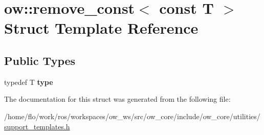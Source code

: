 \hypertarget{structow_1_1remove__const_3_01const_01T_01_4}{}\section{ow\+:\+:remove\+\_\+const$<$ const T $>$ Struct Template Reference}
\label{structow_1_1remove__const_3_01const_01T_01_4}
\subsection*{Public Types}
\begin{DoxyCompactItemize}
\item 
typedef T {\bfseries type}\hypertarget{structow_1_1remove__const_3_01const_01T_01_4_a08b36ca09fc3c79ee3c3c1cbe43d3a8a}{}\label{structow_1_1remove__const_3_01const_01T_01_4_a08b36ca09fc3c79ee3c3c1cbe43d3a8a}

\end{DoxyCompactItemize}


The documentation for this struct was generated from the following file\+:\begin{DoxyCompactItemize}
\item 
/home/flo/work/ros/workspaces/ow\+\_\+ws/src/ow\+\_\+core/include/ow\+\_\+core/utilities/\hyperlink{support__templates_8h}{support\+\_\+templates.\+h}\end{DoxyCompactItemize}
